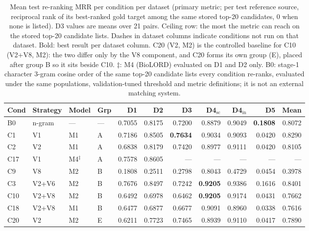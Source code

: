 \begin{table}[t]
\scriptsize
\setlength{\tabcolsep}{4pt}
\begin{threeparttable}
\caption{Mean test re-ranking MRR per condition per dataset (primary metric; per test reference source, reciprocal rank of its best-ranked gold target among the same stored top-20 candidates, 0 when none is listed). D3 values are means over 21 pairs. Ceiling row: the most the metric can reach on the stored top-20 candidate lists. Dashes in dataset columns indicate conditions not run on that dataset. Bold: best result per dataset column. C20 (V2, M2) is the controlled baseline for C10 (V2+V8, M2): the two differ only by the V8 component, and C20 forms its own group (E), placed after group B so it sits beside C10. $\ddagger$: M4 (BioLORD) evaluated on D1 and D2 only. B0: stage-1 character 3-gram cosine order of the same top-20 candidate lists every condition re-ranks, evaluated under the same populations, validation-tuned threshold and metric definitions; it is not an external matching system.}
\label{tab:main_results}
\begin{tabular}{llllrrrrrrr}
\hline
\textbf{Cond} & \textbf{Strategy} & \textbf{Model} & \textbf{Grp} & \textbf{D1} & \textbf{D2} & \textbf{D3} & \textbf{D4$_{\mathrm{sc}}$} & \textbf{D4$_{\mathrm{in}}$} & \textbf{D5} & \textbf{Mean\tnote{*}} \\
\hline
B0 & n-gram & --- & --- & 0.7055 & 0.8175 & 0.7200 & 0.8879 & 0.9049 & \textbf{0.1808} & 0.8072 \\
\hline
C1 & V1 & M1 & A & 0.7186 & 0.8505 & \textbf{0.7634} & 0.9034 & 0.9093 & 0.0420 & 0.8290 \\
C2 & V2 & M1 & A & 0.6838 & 0.8179 & 0.7420 & 0.8977 & 0.9111 & 0.0420 & 0.8105 \\
C17 & V1 & M4$^\ddagger$ & A & 0.7578 & 0.8605 & --- & --- & --- & --- & --- \\
\hline
C9 & V8 & M2 & B & 0.1808 & 0.2511 & 0.2798 & 0.8043 & 0.4729 & 0.0454 & 0.3978 \\
C3 & V2+V6 & M2 & B & 0.7676 & 0.8497 & 0.7242 & \textbf{0.9205} & 0.9386 & 0.1616 & 0.8401 \\
C10 & V2+V8 & M2 & B & 0.6492 & 0.6978 & 0.6462 & \textbf{0.9205} & 0.9174 & 0.0431 & 0.7662 \\
C18 & V2+V8 & M1 & B & 0.6477 & 0.6877 & 0.6677 & 0.9091 & 0.8960 & 0.0338 & 0.7616 \\
\hline
C20 & V2 & M2 & E & 0.6211 & 0.7723 & 0.7465 & 0.8939 & 0.9110 & 0.0417 & 0.7890 \\

\end{tabular}
\end{threeparttable}
\end{table}
